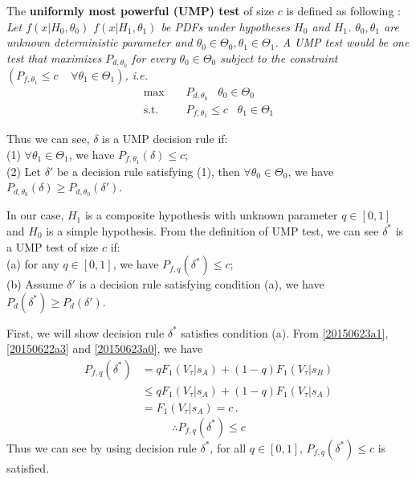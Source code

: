  The \textbf{uniformly most powerful (UMP) test} of size $c$ is defined as following \cite{LehmannTest, poor1994introduction}:
\textit{
  Let $f(x|H_0, \theta_0)$ $f(x|H_1, \theta_1)$ be PDFs under hypotheses $H_0$ and $H_1$. $\theta_0, \theta_1$ are unknown deterministic parameter and $\theta_0 \in \Theta_0, \theta_1 \in \Theta_1$. A UMP test would be one test that maximizes $P_{d, \theta_0}$ for every  $\theta_0 \in \Theta_0$ subject to the constraint $(P_{f,\theta_1} \leq c\;\;\;\;\forall \theta_1 \in \Theta_1)$, i.e. }
\begin{equation}
  \begin{split}
    \max\;\;\;\;&P_{d, \theta_0}\;\;\;\theta_0 \in \Theta_0\\
    \text{s.t.}\;\;\;\;&P_{f, \theta_1} \leq c\;\;\;\theta_1 \in \Theta_1
  \end{split}
\end{equation}

Thus we can see,  $\delta$ is a UMP decision rule if: 
  \\(1) $\forall \theta_1 \in \Theta_1$, we have $P_{f, \theta_1}(\delta) \leq c$;
  \\(2) Let $\delta'$ be a decision rule satisfying (1), then  $\forall \theta_0 \in \Theta_0$, we have $P_{d,\theta_0}(\delta) \geq P_{d, \theta_0}(\delta')$. 

In our case, $H_1$ is a composite hypothesis with unknown parameter $q \in [0, 1]$ and $H_0$ is a simple hypothesis. From the definition of UMP test,  we can see $\delta^\ast$ is a UMP test of size $c$ if:
\\(a) for any $q \in [0, 1]$, we have $P_{f,q}(\delta^\ast) \leq c$;
\\(b) Assume $\delta'$ is a decision rule satisfying condition (a), we have $P_d(\delta^\ast) \geq P_d(\delta')$.  

First, we will show decision rule $\delta^\ast$ satisfies condition (a). From \eqref{20150623a1}, \eqref{20150622a3} and \eqref{20150623a0}, we have 
\begin{equation}
  \begin{split}
    P_{f,q}(\delta^\ast) &= qF_1(V_\tau|s_A) + (1-q)F_1(V_\tau|s_B)\\
    &\leq qF_1(V_\tau|s_A) + (1-q)F_1(V_\tau|s_A)\\
    &= F_1(V_\tau|s_A) = c\,.
  \end{split}
\end{equation}
\begin{equation}
  \therefore P_{f,q}(\delta^\ast) \leq c
  \label{20150705a1}
\end{equation}
Thus we can see by using decision rule $\delta^\ast$, for all $q \in [0, 1]$, $P_{f,q}(\delta^\ast) \leq c$ is satisfied.

